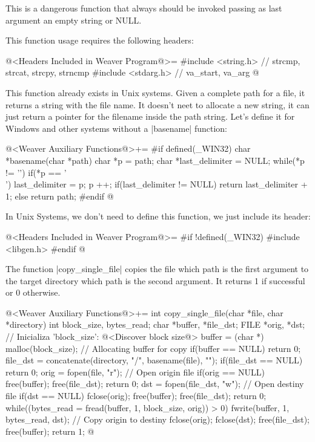 This is a dangerous function that always should be invoked passing as
last argument an empty string or NULL.

This function usage requires the following headers:

\iniciocodigo
@<Headers Included in Weaver Program@>=
#include <string.h> // strcmp, strcat, strcpy, strncmp
#include <stdarg.h> // va_start, va_arg
@
\fimcodigo


This function already exists in Unix systems. Given a complete path
for a file, it returns a string with the file name. It doesn't neet to
allocate a new string, it can just return a pointer for the filename
inside the path string. Let's define it for Windows and other systems
without a |basename| function:

\iniciocodigo
@<Weaver Auxiliary Functions@>+=
#if defined(_WIN32)
char *basename(char *path){
  char *p = path;
  char *last_delimiter = NULL;
  while(*p != '\0'){
    if(*p == '\\')
      last_delimiter = p;
    p ++;
  }
  if(last_delimiter != NULL)
    return last_delimiter + 1;
  else
    return path;
}
#endif
@
\fimcodigo


In Unix Systems, we don't need to define this function, we just
include its header:

\iniciocodigo
@<Headers Included in Weaver Program@>=
#if !defined(_WIN32)
#include <libgen.h>
#endif
@
\fimcodigo


The function |copy_single_file| copies the file which path is the
first argument to the target directory which path is the second
argument. It returns 1 if successful or 0 otherwise.

\iniciocodigo
@<Weaver Auxiliary Functions@>+=
int copy_single_file(char *file, char *directory){
  int block_size, bytes_read;
  char *buffer, *file_dst;
  FILE *orig, *dst;
  // Inicializa 'block_size':
  @<Discover block size@>
  buffer = (char *) malloc(block_size); // Allocating buffer for copy
  if(buffer == NULL) return 0;
  file_dst = concatenate(directory, "/", basename(file), "");
  if(file_dst == NULL) return 0;
  orig = fopen(file, "r"); // Open origin file
  if(orig == NULL){
    free(buffer);
    free(file_dst);
    return 0;
  }
  dst = fopen(file_dst, "w"); // Open destiny file
  if(dst == NULL){
    fclose(orig);
    free(buffer);
    free(file_dst);
    return 0;
  }
  while((bytes_read = fread(buffer, 1, block_size, orig)) > 0){
    fwrite(buffer, 1, bytes_read, dst); // Copy origin to destiny
  }
  fclose(orig);
  fclose(dst);
  free(file_dst);
  free(buffer);
  return 1;
}
@
\fimcodigo

